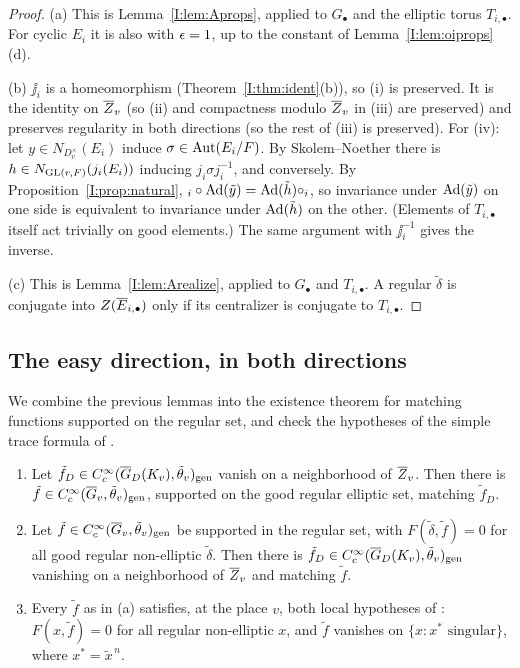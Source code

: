 \begin{proof}
(a) This is Lemma~\ref{I:lem:Aprops}, applied to $G_\bullet$ and the elliptic torus $T_{i,\bullet}$. For cyclic $E_i$ it is also \cite[Lemma~4.5(a)]{JC26a} with $\epsilon=1$, up to the constant of Lemma~\ref{I:lem:oiprops}(d).

(b) $\jj_i$ is a homeomorphism (Theorem~\ref{I:thm:ident}(b)), so (i) is preserved. It is the identity on $\overline{Z}_v$ (so (ii) and compactness modulo $\overline{Z}_v$ in (iii) are preserved) and preserves regularity in both directions (so the rest of (iii) is preserved). For (iv): let $y\in N_{D_v^\times}(E_i)$ induce $\sigma\in\operatorname{Aut}(E_i/F)$. By Skolem--Noether there is $h\in N_{\mathrm{GL}(r,F)}(j_i(E_i))$ inducing $j_i\sigma j_i^{-1}$, and conversely. By Proposition~\ref{I:prop:natural}, $\relax_i\circ\operatorname{Ad}(\tilde y)=\operatorname{Ad}(\tilde h)\circ\relax_i$, so invariance under $\operatorname{Ad}(\tilde y)$ on one side is equivalent to invariance under $\operatorname{Ad}(\tilde h)$ on the other. (Elements of $T_{i,\bullet}$ itself act trivially on good elements.) The same argument with $\jj_i^{-1}$ gives the inverse.

(c) This is Lemma~\ref{I:lem:Arealize}, applied to $G_\bullet$ and $T_{i,\bullet}$. A regular $\tilde\delta$ is conjugate into $Z(\overline{E}_{i,\bullet})$ only if its centralizer is conjugate to $T_{i,\bullet}$.
\end{proof}

\subsection{The easy direction, in both directions}\label{I:subsec:easy}
We combine the previous lemmas into the existence theorem for matching functions supported on the regular set, and check the hypotheses of the simple trace formula of \cite[\S18]{FK86}.

\begin{theorem}\label{I:thm:easy}
\begin{enumerate}[label=(\alph*)]
\item Let $\tilde f_D\in C_c^\infty(\overline{G}_D(K_v),\tilde\theta_v)_{\mathrm{gen}}$ vanish on a neighborhood of $\overline{Z}_v$. Then there is $\tilde f\in C_c^\infty(\overline{G}_v,\tilde\theta_v)_{\mathrm{gen}}$, supported on the good regular elliptic set, matching $\tilde f_D$.
\item Let $\tilde f\in C_c^\infty(\overline{G}_v,\tilde\theta_v)_{\mathrm{gen}}$ be supported in the regular set, with $F(\tilde\delta,\tilde f)=0$ for all good regular non-elliptic $\tilde\delta$. Then there is $\tilde f_D\in C_c^\infty(\overline{G}_D(K_v),\tilde\theta_v)_{\mathrm{gen}}$ vanishing on a neighborhood of $\overline{Z}_v$ and matching $\tilde f$.
\item Every $\tilde f$ as in (a) satisfies, at the place $v$, both local hypotheses of \cite[\S18, Theorem]{FK86}: $F(x,\tilde f)=0$ for all regular non-elliptic $x$, and $\tilde f$ vanishes on $\{x:x^*\text{ singular}\}$, where $x^*=\tilde x^{\,n}$.
\end{enumerate}
\end{theorem}

